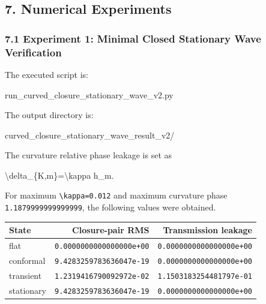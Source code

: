 \documentclass[
  a4paper,
]{article}
\newenvironment{Shaded}{}{}
\newcommand{\NormalTok}[1]{#1}
\newcounter{none} %
\begin{document}
\subsection{7. Numerical Experiments}\label{numerical-experiments}

\subsubsection{7.1 Experiment 1: Minimal Closed Stationary Wave
Verification}\label{experiment-1-minimal-closed-stationary-wave-verification}

The executed script is:

\begin{Shaded}
\begin{Highlighting}[]
\NormalTok{run\_curved\_closure\_stationary\_wave\_v2.py}
\end{Highlighting}
\end{Shaded}

The output directory is:

\begin{Shaded}
\begin{Highlighting}[]
\NormalTok{curved\_closure\_stationary\_wave\_result\_v2/}
\end{Highlighting}
\end{Shaded}

The curvature relative phase leakage is set as

\begin{Shaded}
\begin{Highlighting}[]
\NormalTok{\textbackslash{}delta\_\{K,m\}=\textbackslash{}kappa h\_m.}
\end{Highlighting}
\end{Shaded}

For maximum \texttt{\textbackslash{}kappa=0.012} and maximum curvature
phase \texttt{1.1879999999999999}, the following values were obtained.

{\def\LTcaptype{none} %
\begin{longtable}[]{@{}lrr@{}}
\toprule\noalign{}
State & Closure-pair RMS & Transmission leakage \\
\midrule\noalign{}
\endhead
\bottomrule\noalign{}
\endlastfoot
flat & \texttt{0.0000000000000000e+00} &
\texttt{0.0000000000000000e+00} \\
conformal & \texttt{9.4283259783636047e-19} &
\texttt{0.0000000000000000e+00} \\
transient & \texttt{1.2319416790092972e-02} &
\texttt{1.1503183254481797e-01} \\
stationary & \texttt{9.4283259783636047e-19} &
\texttt{0.0000000000000000e+00} \\
\end{longtable}
}
\end{document}
